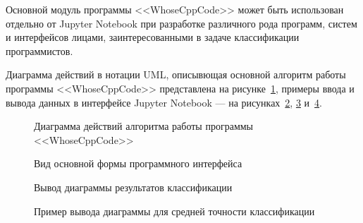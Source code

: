 Основной модуль программы <<WhoseCppCode>> может быть использован отдельно от Jupyter Notebook 
при разработке различного рода программ, систем и интерфейсов лицами, заинтересованными в задаче
классификации программистов.

Диаграмма действий в нотации UML, описывющая основной алгоритм работы программы <<WhoseCppCode>>
представлена на рисунке~\ref{flowchart:flowchart}, примеры ввода и вывода данных в интерфейсе Jupyter 
Notebook --- на рисунках~\ref{main_module:main_module}, \ref{newplot:newplot} и~\ref{newplot2:newplot2}.

\begin{figure}[h!]
\caption{ Диаграмма действий алгоритма работы программы <<WhoseCppCode>> }
\label{flowchart:flowchart}
\end{figure}


\begin{figure}[h!]
\caption{ Вид основной формы программного интерфейса }
\label{main_module:main_module}
\end{figure}

\begin{figure}[h!]
\caption{ Вывод диаграммы результатов классификации }
\label{newplot:newplot}
\end{figure}

\begin{figure}[h!]
\caption{ Пример вывода диаграммы для средней точности классификации }
\label{newplot2:newplot2}
\end{figure}


